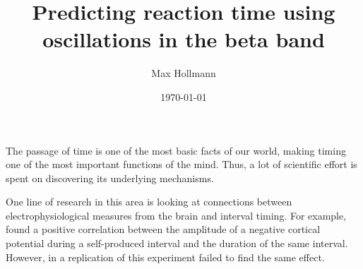 \documentclass[man,floatsintext]{apa6} %
\title{Predicting reaction time using oscillations in the beta band}
\author{Max Hollmann}
\affiliation{University of Groningen}
\date{\today}
\begin{document}
\maketitle

%



The passage of time is one of the most basic facts of our world, making timing one of the most important functions of the mind.
Thus, a lot of scientific effort is spent on discovering its underlying mechanisms.

One line of research in this area is looking at connections between electrophysiological measures from the brain and interval timing.
For example,  found a positive correlation between the amplitude of a negative cortical potential during a self-produced interval and the duration of the same interval.
However, in a replication of this experiment  failed to find the same effect.
\end{document}
